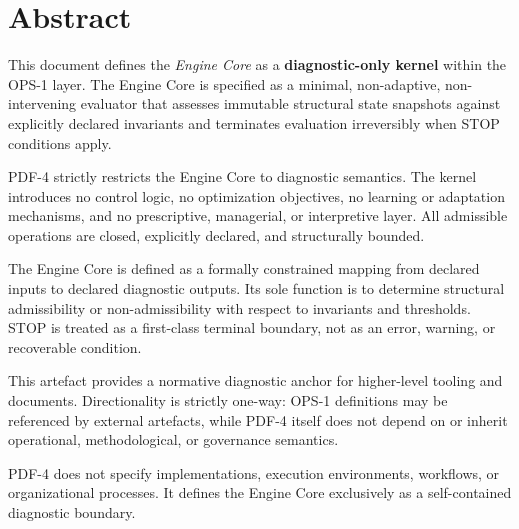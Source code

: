 ﻿\section{Abstract}

This document defines the \emph{Engine Core} as a \textbf{diagnostic-only kernel}
within the OPS-1 layer. The Engine Core is specified as a minimal, non-adaptive,
non-intervening evaluator that assesses immutable structural state snapshots
against explicitly declared invariants and terminates evaluation irreversibly
when STOP conditions apply.

PDF-4 strictly restricts the Engine Core to diagnostic semantics.
The kernel introduces no control logic, no optimization objectives, no learning
or adaptation mechanisms, and no prescriptive, managerial, or interpretive layer.
All admissible operations are closed, explicitly declared, and structurally
bounded.

The Engine Core is defined as a formally constrained mapping from declared inputs
to declared diagnostic outputs. Its sole function is to determine structural
admissibility or non-admissibility with respect to invariants and thresholds.
STOP is treated as a first-class terminal boundary, not as an error, warning,
or recoverable condition.

This artefact provides a normative diagnostic anchor for higher-level tooling
and documents. Directionality is strictly one-way: OPS-1 definitions may be
referenced by external artefacts, while PDF-4 itself does not depend on or
inherit operational, methodological, or governance semantics.

PDF-4 does not specify implementations, execution environments, workflows,
or organizational processes. It defines the Engine Core exclusively as a
self-contained diagnostic boundary.
